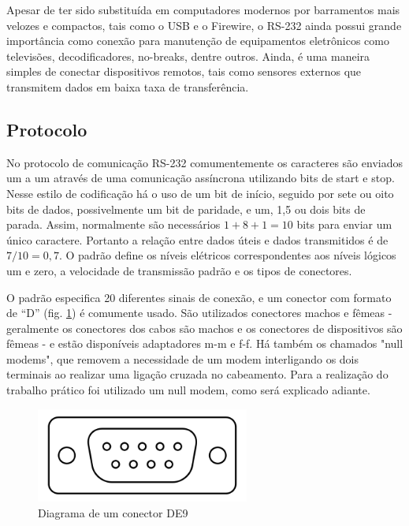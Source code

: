 \documentclass[brazil,times,12pt]{abnt}
\begin{document}
	Apesar de ter sido substituída em computadores modernos por barramentos mais
	velozes e compactos, tais como o USB e o Firewire, o RS-232 ainda possui grande
	importância como conexão para manutenção de equipamentos eletrônicos como
	televisões, decodificadores, no-breaks, dentre outros. Ainda, é uma maneira
	simples de conectar dispositivos remotos, tais como sensores externos que
	transmitem dados em baixa taxa de transferência.
	
	\subsection*{Protocolo}
	No protocolo de comunicação RS-232 comumentemente os caracteres são enviados
	um a um através de uma comunicação assíncrona utilizando bits de start e stop.
	Nesse estilo de codificação há o uso de um bit de início, seguido por sete ou
	oito bits de dados, possivelmente um bit de paridade, e um, 1,5 ou dois bits de
	parada. Assim, normalmente são necessários $1 + 8 + 1 = 10$ bits para enviar um
	único caractere. Portanto a relação entre dados úteis e dados transmitidos é de
	$7/10 = 0,7$. O padrão define os níveis elétricos correspondentes aos níveis
	lógicos um e zero, a velocidade de transmissão padrão e os tipos de
	conectores.\cite{strangio:rs232-standard}
	
	O padrão especifica 20 diferentes sinais de conexão, e um conector com formato
	de ``D'' (fig. \ref{fig:de9}) é comumente usado. São utilizados conectores
	machos e fêmeas - geralmente os conectores dos cabos são machos e os
	conectores de dispositivos são fêmeas - e estão disponíveis adaptadores m-m e
	f-f. Há também os chamados "null modems", que removem a necessidade de um modem
	interligando os dois terminais ao realizar uma ligação cruzada no cabeamento.
	Para a realização do trabalho prático foi utilizado um null modem, como será
	explicado adiante.
	
	\begin{figure}[htp]
	\begin{center}
		\includegraphics[width=70mm]{imagens/DE9.png}
		\caption[Diagrama de um conector DE9]{Diagrama de um conector DE9}
		\label{fig:de9}
	\end{center}
	\end{figure}
	
\end{document}
